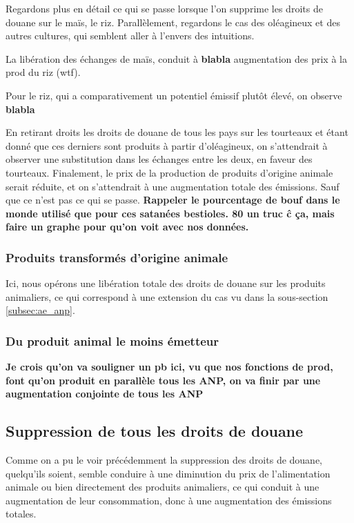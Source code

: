 Regardons plus en détail ce qui se passe lorsque l'on supprime les droits de douane sur le maïs, le riz. Parallèlement, regardons le cas des oléagineux et des autres cultures, qui semblent aller à l'envers des intuitions.

La libération des échanges de maïs, conduit à \textbf{blabla} augmentation des prix à la prod du riz (wtf).

Pour le riz, qui a comparativement un potentiel émissif plutôt élevé, on observe \textbf{blabla}



En retirant droits  les droits de douane de tous les pays sur les tourteaux et étant donné que ces derniers sont produits à partir d'oléagineux, on s'attendrait à observer une substitution dans les échanges entre les deux, en faveur des tourteaux. Finalement, le prix de la production de produits d'origine animale serait réduite, et on s'attendrait à une augmentation totale des émissions. Sauf que ce n'est pas ce qui se passe. \textbf{Rappeler le pourcentage de bouf dans le monde utilisé que pour ces satanées bestioles. 80 un truc ĉ ça, mais faire un graphe pour qu'on voit avec nos données.}



\subsubsection{Produits transformés d'origine animale}

Ici, nous opérons une libération totale des droits de douane sur les produits animaliers, ce qui correspond à une extension du cas vu dans la sous-section \ref{subsec:ae_anp}.

\subsubsection{Du produit animal le moins émetteur}

\textbf{Je crois qu'on va souligner un pb ici, vu que nos fonctions de prod, font qu'on produit en parallèle tous les ANP, on va finir par une augmentation conjointe de tous les ANP}


\subsection{Suppression de tous les droits de douane}

Comme on a pu le voir précédemment la suppression des droits de douane, quelqu'ils soient, semble conduire à une diminution du prix de l'alimentation animale ou bien directement des produits animaliers, ce qui conduit à une augmentation de leur consommation, donc à une augmentation des émissions totales.


